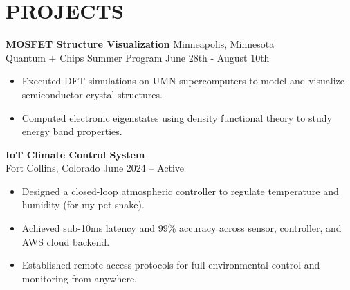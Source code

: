 \documentclass[a4paper,12pt]{extarticle}
\begin{document}




\section*{PROJECTS}

\textbf{MOSFET Structure Visualization}
\hfill Minneapolis, Minnesota \\
Quantum + Chips Summer Program \hfill June 28th - August 10th
\begin{itemize}[topsep=0pt]
\itemindent=-13pt
\item Executed DFT simulations on UMN supercomputers to model and visualize 
semiconductor crystal structures.
\item Computed electronic eigenstates using density functional theory to study 
energy band properties.
\end{itemize}


\vspace{\baselineskip}
\noindent
\textbf{IoT Climate Control System}
\\
Fort Collins, Colorado \hfill June 2024 – Active
\begin{itemize}[topsep=0pt]
\itemindent=-13pt
\item Designed a closed-loop atmospheric controller to regulate 
temperature and humidity (for my pet snake).
\item Achieved sub-10ms latency and 99\% accuracy across sensor, controller, and AWS cloud backend.
\item Established remote access protocols for full environmental control and monitoring from anywhere.
\end{itemize}
\end{document}
